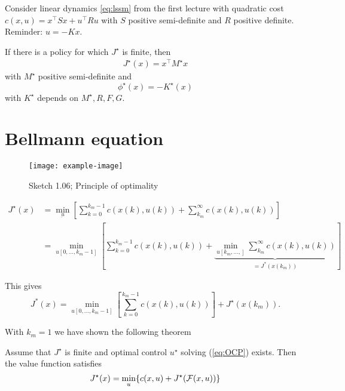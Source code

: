 \begin{example}
    Consider linear dynamics \ref{eq:lssm} %
     from the first lecture with 
    quadratic cost \(c(x,u)=x^\intercal Sx+u^\intercal Ru\) with \(S\) positive semi-definite and 
    \(R\) positive definite.
    Reminder: \(u=-Kx\).

    If there is a policy for which \(J^\star\) is finite, then 
    \begin{align*}
        J^\star(x)=x^\intercal M^\star x
    \end{align*}
    with \(M^\star\) positive semi-definite and 
    \[\phi^\star(x)=-K^\star(x)\]
    with \(K^\star\) depends on \(M^\star,R,F,G\). 
\end{example}

\section*{Bellmann equation}
\begin{figure}[H]\label{fig:1.06}
    \centering
    \texttt{[image: example-image]}
    \caption{Sketch 1.06; Principle of optimality}
\end{figure}


\begin{align*}
    J^\star(x)&=\min_{\underbar{u}}\left[\sum_{k=0}^{k_m-1}c(x(k),u(k))+\sum_{k_m}^\infty c(x(k),u(k))\right]\\
    &=\min_{u[0,\dots,k_m-1]}\left[\sum_{k=0}^{k_m-1}c(x(k),u(k))+\underbrace{\min_{u[k_m,\dots,]}\sum_{k_m}^\infty c(x(k),u(k))}_{=J^*(x(k_m))}\right]
\end{align*}

This gives 
\[J^*(x)=\min_{u[0,\dots,k_m-1]}\left[\sum_{k=0}^{k_m-1}c(x(k),u(k))\right]+J^\star(x(k_m)).\]

With \(k_m=1\) we have shown the following theorem 
\begin{theorem}\label{thm:1.13}
    Assume that \(J^\star\) is finite and optimal control \(u^\star\) solving (\ref{eq:OCP}) exists.
    Then the value function satisfies 
    \begin{equation}\label{eq:bellmann}
        J^\star(x)=\min_{u}\{c(x,u)+J^\star(\mathcal{F}(x,u))\}
    \end{equation}
\end{theorem}

